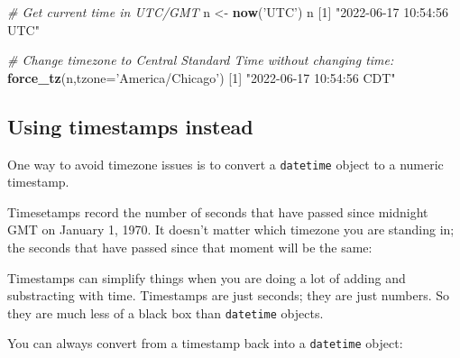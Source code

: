 \documentclass[]{book}
\newenvironment{Shaded}{\begin{snugshade}}{\end{snugshade}}
\newcommand{\CommentTok}[1]{\textcolor[rgb]{0.56,0.35,0.01}{\textit{#1}}}
\newcommand{\DataTypeTok}[1]{\textcolor[rgb]{0.13,0.29,0.53}{#1}}
\newcommand{\DecValTok}[1]{\textcolor[rgb]{0.00,0.00,0.81}{#1}}
\newcommand{\KeywordTok}[1]{\textcolor[rgb]{0.13,0.29,0.53}{\textbf{#1}}}
\newcommand{\NormalTok}[1]{#1}
\newcommand{\OperatorTok}[1]{\textcolor[rgb]{0.81,0.36,0.00}{\textbf{#1}}}
\newcommand{\StringTok}[1]{\textcolor[rgb]{0.31,0.60,0.02}{#1}}
\begin{document}
\begin{Shaded}
\begin{Highlighting}[]
\CommentTok{# Get current time in UTC/GMT}
\NormalTok{n <-}\StringTok{ }\KeywordTok{now}\NormalTok{(}\StringTok{'UTC'}\NormalTok{)}
\NormalTok{n}
\NormalTok{[}\DecValTok{1}\NormalTok{] }\StringTok{"2022-06-17 10:54:56 UTC"}

\CommentTok{# Change timezone to Central Standard Time without changing time: }
\KeywordTok{force_tz}\NormalTok{(n,}\DataTypeTok{tzone=}\StringTok{'America/Chicago'}\NormalTok{)}
\NormalTok{[}\DecValTok{1}\NormalTok{] }\StringTok{"2022-06-17 10:54:56 CDT"}
\end{Highlighting}
\end{Shaded}

\hypertarget{using-timestamps-instead}{%
\subsection*{Using timestamps instead}\label{using-timestamps-instead}}

One way to avoid timezone issues is to convert a \texttt{datetime} object to a numeric timestamp.

Timesetamps record the number of seconds that have passed since midnight GMT on January 1, 1970. It doesn't matter which timezone you are standing in; the seconds that have passed since that moment will be the same:

\begin{Shaded}
\end{Shaded}

Timestamps can simplify things when you are doing a lot of adding and substracting with time. Timestamps are just seconds; they are just numbers. So they are much less of a black box than \texttt{datetime} objects.

You can always convert from a timestamp back into a \texttt{datetime} object:
\end{document}
